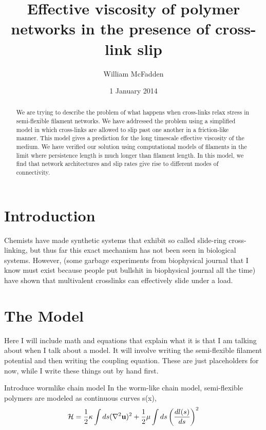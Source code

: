 \documentclass[prb,11pt]{revtex4-1}
\begin{document}
\title{Effective viscosity of polymer networks in the presence of cross-link slip}
\author{William McFadden}

\date{1 January 2014}

\begin{abstract}
We are trying to describe the problem of what happens when cross-links relax stress in semi-flexible filament networks.  We have addressed the problem using a simplified model in which cross-links are allowed to slip past one another in a friction-like manner.  This model gives a prediction for the long timescale effective viscosity of the medium.  We have verified our solution using computational models of filaments in the limit where persistence length is much longer than filament length.  In this model, we find that network architectures and slip rates give rise to different modes of connectivity.
\end{abstract}

\maketitle

\section{Introduction}





Chemists have made synthetic systems that exhibit so called slide-ring cross-linking, but thus far this exact mechanism has not been seen in biological systems.  However, (some garbage experiments from biophysical journal that I know must exist because people put bullshit in biophysical journal all the time) have shown that multivalent crosslinks can effectively slide under a load.

\section{The Model}
Here I will include math and equations that explain what it is that I am talking about when I talk about a model.  It will involve writing the semi-flexible filament potential and then writing the coupling equation.  These are just placeholders for now, while I write these things out by hand first.

Introduce wormlike chain model
In the worm-like chain model, semi-flexible polymers are modeled as continuous curves s(x), 
\begin{equation}
{\cal H} =\frac{1}{2}\kappa \int ds(\nabla^2\mathbf{u})^2 + \frac{1}{2}\mu \int ds \left ( \frac{dl(s) }{ds} \right )^2
\end{equation}
\end{document}
